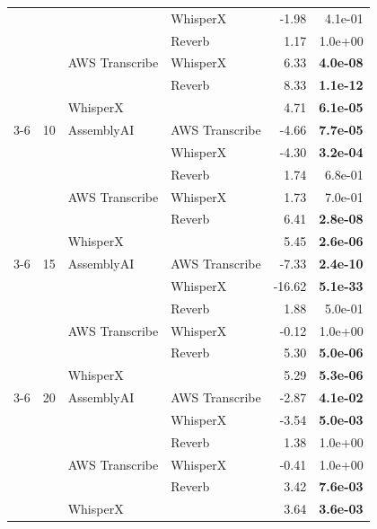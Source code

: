 \begin{tabular}{llllrr}
  &   &   & WhisperX & -1.98 &  4.1e-01 \\
  &   &   & Reverb & 1.17 &  1.0e+00 \\
  &   & AWS Transcribe & WhisperX & 6.33 & \textbf{ 4.0e-08} \\
  &   &   & Reverb & 8.33 & \textbf{ 1.1e-12} \\
  &   & WhisperX &   & 4.71 & \textbf{ 6.1e-05} \\
\cmidrule(r){3-6}
  & 10 & AssemblyAI & AWS Transcribe & -4.66 & \textbf{ 7.7e-05} \\
  &   &   & WhisperX & -4.30 & \textbf{ 3.2e-04} \\
  &   &   & Reverb & 1.74 &  6.8e-01 \\
  &   & AWS Transcribe & WhisperX & 1.73 &  7.0e-01 \\
  &   &   & Reverb & 6.41 & \textbf{ 2.8e-08} \\
  &   & WhisperX &   & 5.45 & \textbf{ 2.6e-06} \\
\cmidrule(r){3-6}
  & 15 & AssemblyAI & AWS Transcribe & -7.33 & \textbf{ 2.4e-10} \\
  &   &   & WhisperX & -16.62 & \textbf{ 5.1e-33} \\
  &   &   & Reverb & 1.88 &  5.0e-01 \\
  &   & AWS Transcribe & WhisperX & -0.12 &  1.0e+00 \\
  &   &   & Reverb & 5.30 & \textbf{ 5.0e-06} \\
  &   & WhisperX &   & 5.29 & \textbf{ 5.3e-06} \\
\cmidrule(r){3-6}
  & 20 & AssemblyAI & AWS Transcribe & -2.87 & \textbf{ 4.1e-02} \\
  &   &   & WhisperX & -3.54 & \textbf{ 5.0e-03} \\
  &   &   & Reverb & 1.38 &  1.0e+00 \\
  &   & AWS Transcribe & WhisperX & -0.41 &  1.0e+00 \\
  &   &   & Reverb & 3.42 & \textbf{ 7.6e-03} \\
  &   & WhisperX &   & 3.64 & \textbf{ 3.6e-03} \\
\bottomrule
\end{tabular}
